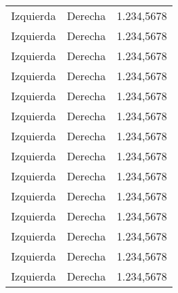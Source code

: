 \begin{longtable}{l|r|c}
  Izquierda & Derecha & 1.234,5678 \\
  Izquierda & Derecha & 1.234,5678 \\
  Izquierda & Derecha & 1.234,5678 \\
  Izquierda & Derecha & 1.234,5678 \\
  Izquierda & Derecha & 1.234,5678 \\
  Izquierda & Derecha & 1.234,5678 \\
  Izquierda & Derecha & 1.234,5678 \\
  Izquierda & Derecha & 1.234,5678 \\
  Izquierda & Derecha & 1.234,5678 \\
  Izquierda & Derecha & 1.234,5678 \\
  Izquierda & Derecha & 1.234,5678 \\
  Izquierda & Derecha & 1.234,5678 \\
  Izquierda & Derecha & 1.234,5678 \\
  Izquierda & Derecha & 1.234,5678 \\

\end{longtable}
